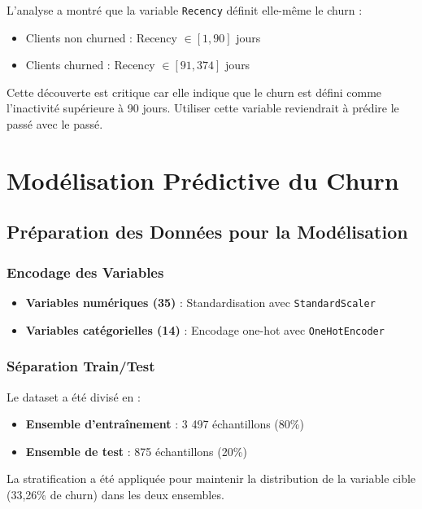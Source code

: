 \documentclass[11pt,a4paper]{article}
\begin{document}
L'analyse a montré que la variable \texttt{Recency} définit elle-même le churn :
\begin{itemize}
    \item Clients non churned : Recency $\in [1, 90]$ jours
    \item Clients churned : Recency $\in [91, 374]$ jours
\end{itemize}

Cette découverte est critique car elle indique que le churn est défini comme l'inactivité supérieure à 90 jours. Utiliser cette variable reviendrait à prédire le passé avec le passé.

\section{Modélisation Prédictive du Churn}

\subsection{Préparation des Données pour la Modélisation}

\subsubsection{Encodage des Variables}
\begin{itemize}
    \item \textbf{Variables numériques (35)} : Standardisation avec \texttt{StandardScaler}
    \item \textbf{Variables catégorielles (14)} : Encodage one-hot avec \texttt{OneHotEncoder}
\end{itemize}

\subsubsection{Séparation Train/Test}
Le dataset a été divisé en :
\begin{itemize}
    \item \textbf{Ensemble d'entraînement} : 3 497 échantillons (80\%)
    \item \textbf{Ensemble de test} : 875 échantillons (20\%)
\end{itemize}

La stratification a été appliquée pour maintenir la distribution de la variable cible (33,26\% de churn) dans les deux ensembles.
\end{document}
